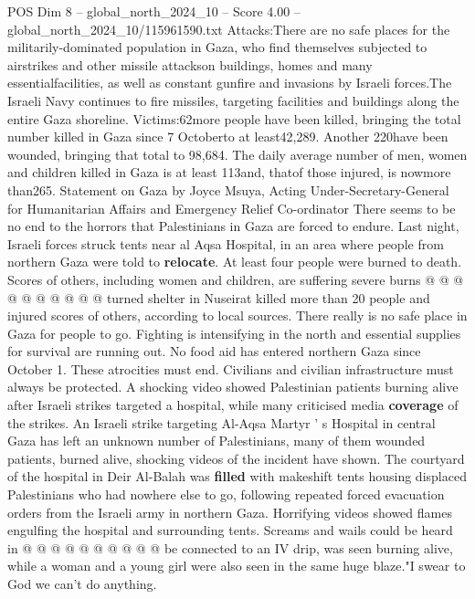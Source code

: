 \begin{textsample}{POS Dim 8 – global\_north\_2024\_10 – Score 4.00 – global\_north\_2024\_10/115961590.txt}  \label{ex:f8_pos_246}
Attacks:There are no safe places for the militarily-dominated population in Gaza, who find themselves subjected to airstrikes and other missile attackson buildings, homes and many essentialfacilities, as well as constant gunfire and invasions by Israeli forces.The Israeli Navy continues to fire missiles, targeting facilities and buildings along the entire Gaza shoreline.
Victims:62more people have been killed, bringing the total number killed in Gaza since 7 Octoberto at least42,289.
Another 220have been wounded, bringing that total to 98,684.
The daily average number of men, women and children killed in Gaza is at least 113and, thatof those injured, is nowmore than265.
Statement on Gaza by Joyce Msuya, Acting Under-Secretary-General for Humanitarian Affairs and Emergency Relief Co-ordinator There seems to be no end to the horrors that Palestinians in Gaza are forced to endure.
Last night, Israeli forces struck tents near al Aqsa Hospital, in an area where people from northern Gaza were told to \textbf{relocate}.
At least four people were burned to death.
Scores of others, including women and children, are suffering severe burns @ @ @ @ @ @ @ @ @ @ turned shelter in Nuseirat killed more than 20 people and injured scores of others, according to local sources.
There really is no safe place in Gaza for people to go.
Fighting is intensifying in the north and essential supplies for survival are running out.
No food aid has entered northern Gaza since October 1.
These atrocities must end.
Civilians and civilian infrastructure must always be protected.
A shocking video showed Palestinian patients burning alive after Israeli strikes targeted a hospital, while many criticised media \textbf{coverage} of the strikes.
An Israeli strike targeting Al-Aqsa Martyr ' s Hospital in central Gaza has left an unknown number of Palestinians, many of them wounded patients, burned alive, shocking videos of the incident have shown.
The courtyard of the hospital in Deir Al-Balah was \textbf{filled} with makeshift tents housing displaced Palestinians who had nowhere else to go, following repeated forced evacuation orders from the Israeli army in northern Gaza.
Horrifying videos showed flames engulfing the hospital and surrounding tents.
Screams and wails could be heard in @ @ @ @ @ @ @ @ @ @ be connected to an IV drip, was seen burning alive, while a woman and a young girl were also seen in the same huge blaze."I swear to God we can't do anything.

\end{textsample}
